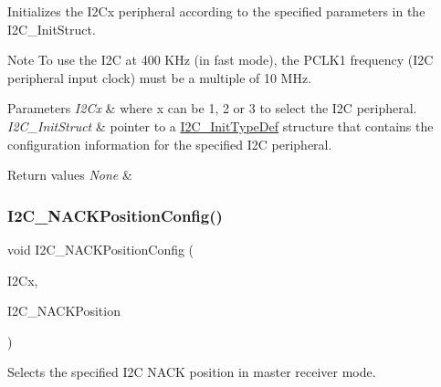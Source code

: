 Initializes the I2\+Cx peripheral according to the specified parameters in the I2\+C\+\_\+\+Init\+Struct. 

\begin{DoxyNote}{Note}
To use the I2C at 400 K\+Hz (in fast mode), the P\+C\+L\+K1 frequency (I2C peripheral input clock) must be a multiple of 10 M\+Hz. ~\newline
 
\end{DoxyNote}

\begin{DoxyParams}{Parameters}
{\em I2\+Cx} & where x can be 1, 2 or 3 to select the I2C peripheral. \\
\hline
{\em I2\+C\+\_\+\+Init\+Struct} & pointer to a \mbox{\hyperlink{struct_i2_c___init_type_def}{I2\+C\+\_\+\+Init\+Type\+Def}} structure that contains the configuration information for the specified I2C peripheral. \\
\hline
\end{DoxyParams}

\begin{DoxyRetVals}{Return values}
{\em None} & \\
\hline
\end{DoxyRetVals}
\mbox{\label{group___i2_c___group1_gad08ebffc3a234d84e6405ec115bd74f1}} 
\subsubsection{\texorpdfstring{I2\+C\+\_\+\+N\+A\+C\+K\+Position\+Config()}{I2C\_NACKPositionConfig()}}
{\footnotesize\ttfamily void I2\+C\+\_\+\+N\+A\+C\+K\+Position\+Config (\begin{DoxyParamCaption}\item[{I2\+C\+\_\+\+Type\+Def $\ast$}]{I2\+Cx,  }\item[{uint16\+\_\+t}]{I2\+C\+\_\+\+N\+A\+C\+K\+Position }\end{DoxyParamCaption})}



Selects the specified I2C N\+A\+CK position in master receiver mode. 

